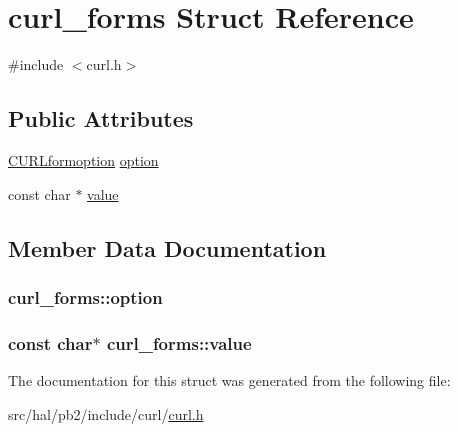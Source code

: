\hypertarget{structcurl__forms}{}\section{curl\+\_\+forms Struct Reference}
\label{structcurl__forms}


{\ttfamily \#include $<$curl.\+h$>$}

\subsection*{Public Attributes}
\begin{DoxyCompactItemize}
\item 
\hyperlink{curl_8h_ae5d88dd64ce41daec95c47679b8c000f}{C\+U\+R\+Lformoption} \hyperlink{structcurl__forms_a10acf738004892eb1663e560af087aa7}{option}
\item 
const char $\ast$ \hyperlink{structcurl__forms_ac7d32e35e6d174ed54f28eab150f12e6}{value}
\end{DoxyCompactItemize}


\subsection{Member Data Documentation}
\subsubsection[{\texorpdfstring{option}{option}}]{ curl\+\_\+forms\+::option}\hypertarget{structcurl__forms_a10acf738004892eb1663e560af087aa7}{}\label{structcurl__forms_a10acf738004892eb1663e560af087aa7}
\subsubsection[{\texorpdfstring{value}{value}}]{\setlength{\rightskip}{0pt plus 5cm}const char$\ast$ curl\+\_\+forms\+::value}\hypertarget{structcurl__forms_ac7d32e35e6d174ed54f28eab150f12e6}{}\label{structcurl__forms_ac7d32e35e6d174ed54f28eab150f12e6}


The documentation for this struct was generated from the following file\+:\begin{DoxyCompactItemize}
\item 
src/hal/pb2/include/curl/\hyperlink{curl_8h}{curl.\+h}\end{DoxyCompactItemize}
